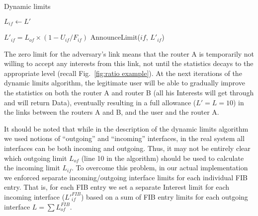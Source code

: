\begin{algorithm}[h]
\caption{Dynamic limits}
\label{alg:dynamic limits}
\begin{algorithmic}[1]
\State{} 
\vspace{0.2cm}
  

\vspace{0.2cm}

\State{} 
    \State $L_{if} \leftarrow L'$
\EndFunction

\vspace{0.2cm}

 

        \State $L'_{if}= {L_{of}} \times (1 - U_{if}/F_{if})$
        \State AnnounceLimit($if$, $L'_{if}$)
   \EndFor

\EndFor
\EndFunction

\end{algorithmic}
\end{algorithm}

The zero limit for the adversary's link means that the router A is temporarily not willing to accept any interests from this link, not until the statistics decays to the appropriate level (recall Fig.~\ref{fig:ratio example}).
At the next iterations of the dynamic limits algorithm, the legitimate user will be able to gradually improve the statistics on both the router A and router B (all his Interests will get through and will return Data), eventually resulting in a full allowance ($L'=L=10$) in the links between the routers A and B, and the user and the router A.

It should be noted that while in the description of the dynamic limits algorithm we used notions of ``outgoing'' and ``incoming'' interfaces, in the real system all interfaces can be both incoming and outgoing.
Thus, it may not be entirely clear which outgoing limit $L_{of}$ (line 10 in the algorithm) should be used to calculate the incoming limit $L_{if}$.
To overcome this problem, in our actual implementation we enforced separate incoming/outgoing interface limits for each individual FIB entry.
That is, for each FIB entry we set a separate Interest limit for each incoming interface ($L'_{if}^{FIB}$) based on a sum of FIB entry limits for each outgoing interface $L=\sum{L_{of}^{FIB}}$.



